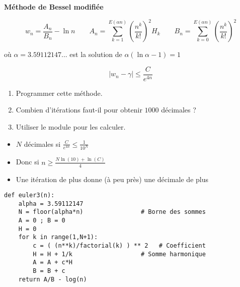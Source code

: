 \begin{frame}

\hfill\hfill\textbf{Méthode de Bessel modifiée}

$$w_n = \frac{A_n}{B_n} - \ln n 
\qquad 
A_n =\sum_{k=1}^{E(\alpha n)} \left( \frac{n^k}{k!} \right)^2 H_k
 \qquad 
B_n =\sum_{k=0}^{E(\alpha n)} \left( \frac{n^k}{k!} \right)^2 
$$

\pause
\centerline{où $\alpha = 3.59112147...$ est la solution de $\alpha(\ln \alpha - 1)=1$}

\pause

$$|w_n - \gamma| \le \frac{C}{e^{4n}}$$

\pause

\begin{tp}
\begin{enumerate}
  \item Programmer cette méthode.
  \item Combien d'itérations faut-il pour obtenir $1000$ décimales ?
  \item Utiliser le module  pour les calculer.
\end{enumerate}
\end{tp}
\end{frame}

\begin{frame}[fragile]

\begin{itemize}
  \item $N$ décimales si $\frac{C}{e^{4n}} \le \frac{1}{10^{N}}$
\pause
  \item Donc si $n \ge \frac{N \ln(10)+\ln(C)}{4}$
\pause
  \item Une itération de plus donne (à peu près) une décimale de plus
\end{itemize}

\pause

\begin{algo}[euler.py (3)]
\begin{lstlisting}
def euler3(n):
    alpha = 3.59112147
    N = floor(alpha*n)                # Borne des sommes
    A = 0 ; B = 0
    H = 0
    for k in range(1,N+1):
        c = ( (n**k)/factorial(k) ) ** 2   # Coefficient 
        H = H + 1/k                   # Somme harmonique
        A = A + c*H
        B = B + c
    return A/B - log(n)
\end{lstlisting}  
\end{algo}

\end{frame}

